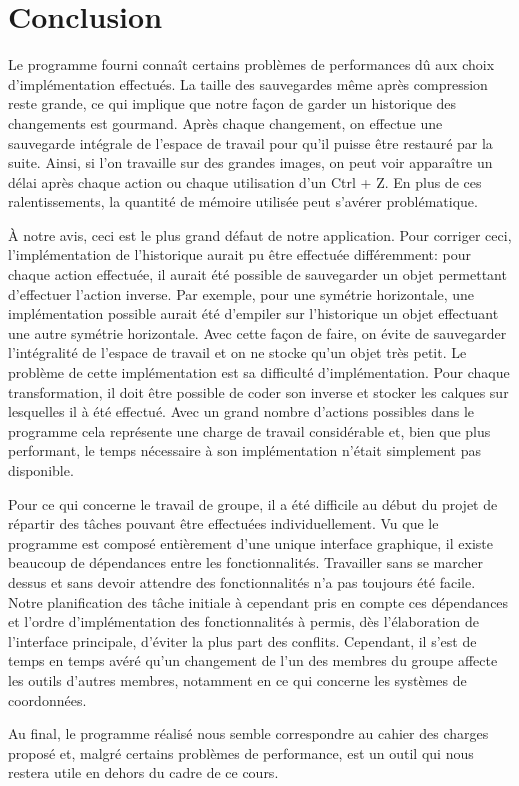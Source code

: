 \section{Conclusion}
Le programme fourni connaît certains problèmes de performances dû aux choix d'implémentation effectués. La taille des sauvegardes même après compression reste grande, ce qui implique que notre façon de garder un historique des changements est gourmand. Après chaque changement, on effectue une sauvegarde intégrale de l'espace de travail pour qu'il puisse être restauré par la suite. Ainsi, si l'on travaille sur des grandes images, on peut voir apparaître un délai après chaque action ou chaque utilisation d'un Ctrl + Z. En plus de ces ralentissements, la quantité de mémoire utilisée peut s'avérer problématique.

À notre avis, ceci est le plus grand défaut de notre application. Pour corriger ceci, l'implémentation de l'historique aurait pu être effectuée différemment: pour chaque action effectuée, il aurait été possible de sauvegarder un objet permettant d'effectuer l'action inverse. Par exemple, pour une symétrie horizontale, une implémentation possible aurait été d'empiler sur l'historique un objet effectuant une autre symétrie horizontale. Avec cette façon de faire, on évite de sauvegarder l'intégralité de l'espace de travail et on ne stocke qu'un objet très petit. Le problème de cette implémentation est sa difficulté d'implémentation. Pour chaque transformation, il doit être possible de coder son inverse et stocker les calques sur lesquelles il à été effectué. Avec un grand nombre d'actions possibles dans le programme cela représente une charge de travail considérable et, bien que plus performant, le temps nécessaire à son implémentation n'était simplement pas disponible.

Pour ce qui concerne le travail de groupe, il a été difficile au début du projet de répartir des tâches pouvant être effectuées individuellement. Vu que le programme est composé entièrement d'une unique interface graphique, il existe beaucoup de dépendances entre les fonctionnalités. Travailler sans se marcher dessus et sans devoir attendre des fonctionnalités n'a pas toujours été facile. Notre planification des tâche initiale à cependant pris en compte ces dépendances et l'ordre d'implémentation des fonctionnalités à permis, dès l'élaboration de l'interface principale, d'éviter la plus part des conflits. Cependant, il s'est de temps en temps avéré qu'un changement de l'un des membres du groupe affecte les outils d'autres membres, notamment en ce qui concerne les systèmes de coordonnées.

Au final, le programme réalisé nous semble correspondre au cahier des charges proposé et, malgré certains problèmes de performance, est un outil qui nous restera utile en dehors du cadre de ce cours.
